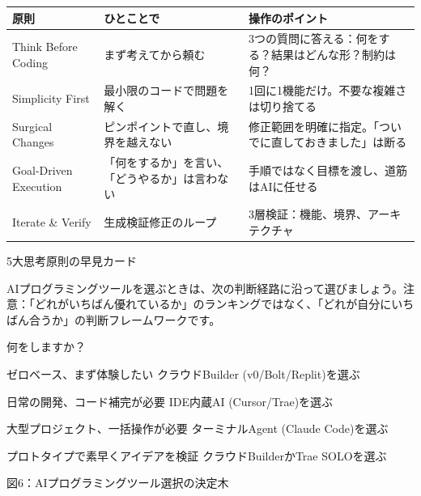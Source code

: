 


\begin{center}
\begin{tabularx}{\linewidth}{|X|X|X|}
\hline
\textbf{原則} & \textbf{ひとことで} & \textbf{操作のポイント} \tabularnewline
\hline
Think Before Coding & まず考えてから頼む & 3つの質問に答える：何をする？結果はどんな形？制約は何？ \tabularnewline
Simplicity First & 最小限のコードで問題を解く & 1回に1機能だけ。不要な複雑さは切り捨てる \tabularnewline
Surgical Changes & ピンポイントで直し、境界を越えない & 修正範囲を明確に指定。「ついでに直しておきました」は断る \tabularnewline
Goal-Driven Execution & 「何をするか」を言い、「どうやるか」は言わない & 手順ではなく目標を渡し、道筋はAIに任せる \tabularnewline
Iterate \& Verify & 生成検証修正のループ & 3層検証：機能、境界、アーキテクチャ \tabularnewline
\hline
\end{tabularx}
\end{center}

\begin{center}\small\color{gray}5大思考原則の早見カード\end{center}


AIプログラミングツールを選ぶときは、次の判断経路に沿って選びましょう。注意：「どれがいちばん優れているか」のランキングではなく、「どれが自分にいちばん合うか」の判断フレームワークです。

何をしますか？

ゼロベース、まず体験したい クラウドBuilder (v0/Bolt/Replit)を選ぶ

日常の開発、コード補完が必要 IDE内蔵AI (Cursor/Trae)を選ぶ

大型プロジェクト、一括操作が必要 ターミナルAgent (Claude Code)を選ぶ

プロトタイプで素早くアイデアを検証 クラウドBuilderかTrae SOLOを選ぶ

\begin{center}\small\color{gray}図6：AIプログラミングツール選択の決定木\end{center}

